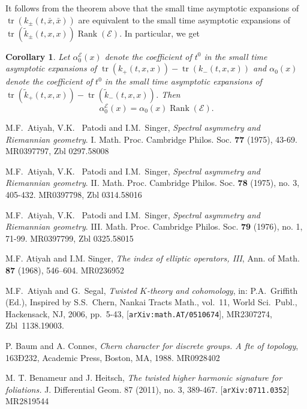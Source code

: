 \documentclass[12pt]{amsart}
\theoremstyle{plain}
\newtheorem{corollary}[theorem]{Corollary}
\theoremstyle{definition}
\theoremstyle{remark}
\begin{document}
{It follows from the theorem above that the small time asymptotic expansions of $ {\operatorname{tr}}( k_\pm(t,\bar x,\bar x))$
are equivalent to the small time asymptotic expansions of $ {\operatorname{tr}}( \widetilde k_\pm(t,x,x)) {\operatorname{Rank}}({\mathcal E})$.
In particular, we get 

\begin{corollary}\label{cor:indexcoeff}
Let $\alpha_0^{\mathcal E}(x)$ denote the coefficient of $t^0$ in the small time asymptotic expansions of ${\operatorname{tr}}(k_+(t,x,x))- {\operatorname{tr}}(k_-(t,x,x))$ 
and $\alpha_0(x)$ denote the coefficient of $t^0$ in the small time asymptotic expansions of ${\operatorname{tr}}(\widetilde k_+(t,x,x))- {\operatorname{tr}}( \widetilde k_-(t,x,x))$.
Then 
$$
\alpha_0^{\mathcal E}(x) = \alpha_0(x)  {\operatorname{Rank}}({\mathcal E}).
$$

\end{corollary}

\begin{thebibliography}{99}

M.F.~Atiyah, V.K. ~Patodi and I.M.~Singer, 
{\em Spectral asymmetry and Riemannian geometry}. I. 
Math. Proc. Cambridge Philos. Soc. {\bf 77} (1975), 43-69.
MR0397797, Zbl 0297.58008 

M.F.~Atiyah, V.K. ~Patodi and I.M.~Singer,  
{\em Spectral asymmetry and Riemannian geometry}. II. 
Math. Proc. Cambridge Philos. Soc. {\bf 78} (1975), no. 3, 405-432. 
MR0397798, Zbl 0314.58016

M.F.~Atiyah, V.K. ~Patodi and I.M.~Singer, 
{\em Spectral asymmetry and Riemannian geometry}. III. 
Math. Proc. Cambridge Philos. Soc. {\bf 79} (1976), no. 1, 71-99. 
MR0397799, Zbl 0325.58015

M.F. Atiyah and I.M. Singer, \emph{The index of elliptic operators, {III}},
  Ann. of Math. \textbf{87} (1968), 546--604.
MR0236952

M.F.~Atiyah and G.~Segal,
{\it Twisted $K$-theory and cohomology}, in: P.A.~Griffith (Ed.),
Inspired by S.S.\ Chern, Nankai Tracts Math., vol.\ 11, World Sci.\ Publ.,
Hackensack, NJ, 2006, pp.~5-43, [{\tt arXiv:math.AT/0510674}],
MR2307274, Zbl~1138.19003.

P. Baum and A. Connes, {\em{Chern character for discrete groups. A fte of topology}}, 163Ð232, Academic Press, Boston, MA, 1988.
MR0928402

M. T. Benameur and J. Heitsch, {\it The twisted higher harmonic signature for foliations.} J. Differential Geom. 87 (2011), no. 3, 389-467.  [{\tt arXiv:0711.0352}]
MR2819544


\end{thebibliography}}
\end{document}
